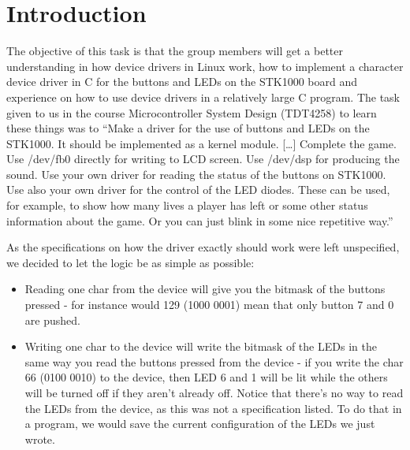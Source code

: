 \section{Introduction}

The objective of this task is that the group members will get a better
understanding in how device drivers in Linux work, how to implement a
character device driver in C for the buttons and LEDs on the STK1000
board and experience on how to use device drivers in a relatively large
C program. The task given to us in the course Microcontroller System
Design (TDT4258) to learn these things was to ``Make a driver for the
use of buttons and LEDs on the STK1000. It should be implemented as a
kernel module. [\ldots] Complete the game. Use /dev/fb0 directly for
writing to LCD screen. Use /dev/dsp for producing the sound. Use your
own driver for reading the status of the buttons on STK1000. Use also
your own driver for the control of the LED diodes. These can be used,
for example, to show how many lives a player has left or some other
status information about the game. Or you can just blink in some nice
repetitive way.''\cite{comp}

As the specifications on how the driver exactly should work were left
unspecified, we decided to let the logic be as simple as possible:
\begin{itemize}
\item Reading one char from the device will give you the bitmask of the
      buttons pressed - for instance would 129 (1000 0001) mean that only
      button 7 and 0 are pushed. 
\item Writing one char to the device will write the bitmask of the LEDs
      in the same way you read the buttons pressed from the device - if
      you write the char 66 (0100 0010) to the device, then LED 6 and 1
      will be lit while the others will be turned off if they aren't
      already off. Notice that there's no way to read the LEDs from the
      device, as this was not a specification listed. To do that in a
      program, we would save the current configuration of the LEDs we
      just wrote.
\end{itemize}

